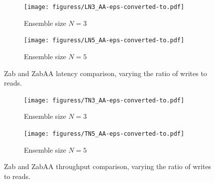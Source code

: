 \documentclass[a4paper,UKenglish]{oasics-v2016}
\begin{document}
\begin{figure}[h]
\centering
\captionsetup[subfigure]{justification=centering}
	\begin{subfigure}{.49\textwidth}
		\texttt{[image: figuress/LN3\_AA-eps-converted-to.pdf]}
		\caption{Ensemble size $N=3$}
		\label{LatencyAAN3}
	\end{subfigure}		
	\begin{subfigure}{.49\textwidth}
	\centering
		\texttt{[image: figuress/LN5\_AA-eps-converted-to.pdf]}
		\caption{Ensemble size $N=5$}
		\label{LatencyAAN5}
	\end{subfigure}		
	\caption{Zab and ZabAA latency comparison, varying the ratio of writes to reads.}
	\label{latency comparisonN3}
\end{figure}


\begin{figure}[h]
\centering
\captionsetup[subfigure]{justification=centering}
	\begin{subfigure}{.49\textwidth}
		\texttt{[image: figuress/TN3\_AA-eps-converted-to.pdf]}
		\caption{Ensemble size $N=3$}
		\label{ThroughputAAN3}
	\end{subfigure}		
	\begin{subfigure}{.49\textwidth}
		\texttt{[image: figuress/TN5\_AA-eps-converted-to.pdf]}
		\caption{Ensemble size $N=5$}
		\label{ThroughputAAN5}
	\end{subfigure}		
	\caption{Zab and ZabAA throughput comparison, varying the ratio of writes to reads.}
	\label{latency comparisonN5}
\end{figure}

\end{document}
